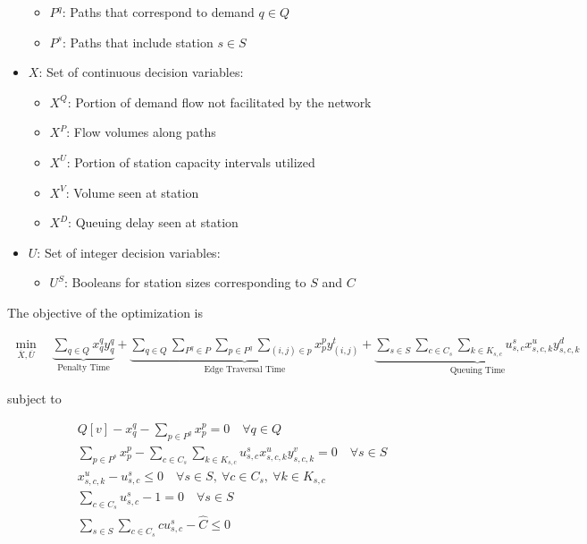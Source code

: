 \documentclass[12pt]{article}
\begin{document}
\begin{itemize}
\begin{itemize}
		\item $P^q$: Paths that correspond to demand $q \in Q$
		\item $P^s$: Paths that include station $s \in S$
	\end{itemize}
	\item $X$: Set of continuous decision variables: \begin{itemize}
		\item $X^Q$: Portion of demand flow not facilitated by the network
		\item $X^P$: Flow volumes along paths
		\item $X^U$: Portion of station capacity intervals utilized
		\item $X^V$: Volume seen at station
		\item $X^D$: Queuing delay seen at station
	\end{itemize}
	\item $U$: Set of integer decision variables: \begin{itemize}
		\item $U^S$: Booleans for station sizes corresponding to $S$ and $C$
	\end{itemize}
\end{itemize}


The objective of the optimization is

\begin{gather}
	\min_{\overline{X},\overline{U}}\quad \underbrace{\sum_{q \in Q} x^q_qy^q_q}_{\text{Penalty Time}} + \underbrace{\sum_{q \in Q}\sum_{P^q \in P}\sum_{p \in P^q}\sum_{(i, j) \in p} x^p_py^t_{(i, j)}}_{\text{Edge Traversal Time}} + \underbrace{\sum_{s \in S}\sum_{c \in C_s}
	\sum_{k \in K_{s, c}} u^s_{s, c}x^u_{s, c, k}y^d_{s, c, k}}_{\text{Queuing Time}} \label{eq:tm:obj}
\end{gather}

subject to

\begin{gather}
	Q[v] - x^q_q - \sum_{p \in P^q}x^p_p = 0 \quad \forall q \in Q \label{eq:tm:flow_dem} \\
	\sum_{p \in P^s} x^p_p - \sum_{c \in C_s}
	\sum_{k \in K_{s, c}} u^s_{s, c}x^u_{s, c, k}y^v_{s, c, k} = 0 \quad \forall s \in S \label{eq:tm:flow_cons} \\
	x^u_{s, c, k} - u^s_{s, c} \leq 0 \quad \forall s \in S, \ \forall c \in C_s,\ \forall k\in K_{s, c} \label{eq:tm:sz_int} \\
	\sum_{c \in C_s} u^s_{s, c} - 1 = 0 \quad \forall s \in S \label{eq:tm:chg_unity} \\
	\sum_{s \in S}\sum_{c \in C_s} cu^s_{s, c} - \hat{C} \leq 0 \label{eq:tm:chg_tot}
\end{gather}
\end{document}
